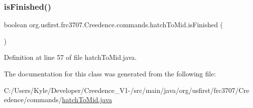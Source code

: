 \subsubsection{\texorpdfstring{isFinished()}{isFinished()}}
{\footnotesize\ttfamily boolean org.\+usfirst.\+frc3707.\+Creedence.\+commands.\+hatch\+To\+Mid.\+is\+Finished (\begin{DoxyParamCaption}{ }\end{DoxyParamCaption})\hspace{0.3cm}{\ttfamily [protected]}}



Definition at line 57 of file hatch\+To\+Mid.\+java.



The documentation for this class was generated from the following file\+:\begin{DoxyCompactItemize}
\item 
C\+:/\+Users/\+Kyle/\+Developer/\+Creedence\+\_\+\+V1-\//src/main/java/org/usfirst/frc3707/\+Creedence/commands/\mbox{\hyperlink{hatch_to_mid_8java}{hatch\+To\+Mid.\+java}}\end{DoxyCompactItemize}
